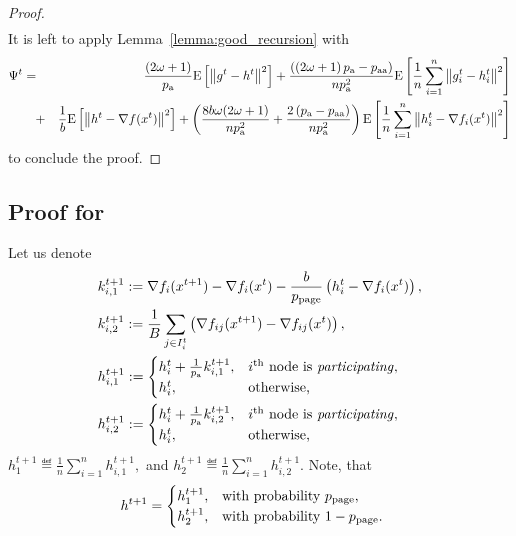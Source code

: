 \documentclass{article}
\newcommand{\algorithmname}{DASHA-PP}
\newcommand*{\probavailable}{\ensuremath{p_{\textnormal{a}}}}
\newcommand*{\probpairaa}{\ensuremath{p_{\textnormal{aa}}}}
\newcommand*{\probpage}{\ensuremath{p_{\text{page}}}}
\begin{document}
\begin{proof}
\begin{align*}
    \end{align*}
    It is left to apply Lemma~\ref{lemma:good_recursion} with 
    \begin{eqnarray*}
      \Psi^t &=& \frac{(2 \omega + 1)}{\probavailable} \Exp{\norm{g^{t} - h^{t}}^2} + \frac{(\left(2 \omega + 1\right)\probavailable - \probpairaa)}{n \probavailable^2} \Exp{\frac{1}{n}\sum_{i=1}^n\norm{g^{t}_i - h^{t}_i}^2} \\
        &\quad +& \frac{1}{b} \Exp{\norm{h^{t} - \nabla f(x^{t})}^2} + \left(\frac{8 b \omega (2 \omega + 1)}{n \probavailable^2} + \frac{2 \left(\probavailable - \probpairaa\right)}{n \probavailable^2}\right)\Exp{\frac{1}{n}\sum_{i=1}^n\norm{h^{t}_i - \nabla f_i(x^{t})}^2}
    \end{eqnarray*}
    to conclude the proof.
\end{proof}

\subsection{Proof for \algname{\algorithmname-PAGE}}

Let us denote
\begin{align*}
    &k^{t+1}_{i, 1} \eqdef \nabla f_i(x^{t+1}) - \nabla f_i(x^{t}) - \frac{b}{\probpage} \left(h^t_i - \nabla f_i(x^{t})\right), \\
    &k^{t+1}_{i, 2} \eqdef \frac{1}{B}\sum_{j \in I^t_i}\left(\nabla f_{ij}(x^{t+1}) - \nabla f_{ij}(x^{t})\right), \\
    &h^{t+1}_{i,1} \eqdef \begin{cases}
        h^t_i + \frac{1}{\probavailable} k^{t+1}_{i, 1},& i^{\textnormal{th}} \textnormal{ node is \textit{participating}}, \\
        h^t_i, & \textnormal{otherwise,} 
    \end{cases}  \\
    &h^{t+1}_{i,2} \eqdef \begin{cases}
        h^t_i + \frac{1}{\probavailable} k^{t+1}_{i, 2},& i^{\textnormal{th}} \textnormal{ node is \textit{participating}}, \\
        h^t_i, & \textnormal{otherwise,}
    \end{cases}  \\
\end{align*}
$h^{t+1}_{1} \eqdef \frac{1}{n}\sum_{i=1}^n h^{t+1}_{i,1},$ and $h^{t+1}_{2} \eqdef \frac{1}{n}\sum_{i=1}^n h^{t+1}_{i,2}.$ Note, that
\begin{align*}
  &h^{t+1} = \begin{cases}
    h^{t+1}_{1},& \textnormal{with probability $\probpage$,} \\
    h^{t+1}_{2},& \textnormal{with probability $1 - \probpage$.} 
  \end{cases}
\end{align*}
\end{document}

